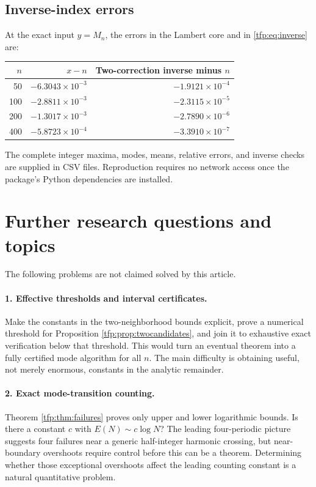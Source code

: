 \documentclass[11pt,a4paper]{article}
\numberwithin{equation}{section}
\theoremstyle{definition}\newtheorem{definition}[theorem]{Definition}
\theoremstyle{remark}\newtheorem{remark}[theorem]{Remark}
\begin{document}
\subsection{Inverse-index errors}
At the exact input $y=M_n$, the errors in the Lambert core and in
\eqref{tfp:eq:inverse} are:
\begin{center}
\begin{tabular}{r r r}
\toprule
$n$ & $x-n$ & Two-correction inverse minus $n$\\
\midrule
50  & $-6.3043\times10^{-3}$ & $-1.9121\times10^{-4}$\\
100 & $-2.8811\times10^{-3}$ & $-2.3115\times10^{-5}$\\
200 & $-1.3017\times10^{-3}$ & $-2.7890\times10^{-6}$\\
400 & $-5.8723\times10^{-4}$ & $-3.3910\times10^{-7}$\\
\bottomrule
\end{tabular}
\end{center}
The complete integer maxima, modes, means, relative errors, and inverse
checks are supplied in CSV files. Reproduction requires no network
access once the package's Python dependencies are installed.

\section{Further research questions and topics}\label{tfp:sec:questions}
The following problems are not claimed solved by this article.

\paragraph{1. Effective thresholds and interval certificates.}
Make the constants in the two-neighborhood bounds explicit, prove a
numerical threshold for Proposition \ref{tfp:prop:twocandidates}, and join
it to exhaustive exact verification below that threshold. This would
turn an eventual theorem into a fully certified mode algorithm for all
$n$. The main difficulty is obtaining useful, not merely enormous,
constants in the analytic remainder.

\paragraph{2. Exact mode-transition counting.}
Theorem \ref{tfp:thm:failures} proves only upper and lower logarithmic
bounds. Is there a constant $c$ with $E(N)\sim c\log N$? The leading
four-periodic picture suggests four failures near a generic
half-integer harmonic crossing, but near-boundary overshoots require
control before this can be a theorem. Determining whether those
exceptional overshoots affect the leading counting constant is a
natural quantitative problem.
\end{document}
